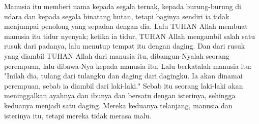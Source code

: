 \begin{biblechapter}
\verse Manusia itu memberi nama kepada segala ternak, kepada burung-burung di udara dan kepada segala binatang hutan, tetapi baginya sendiri ia tidak menjumpai penolong yang sepadan dengan dia.
\verse Lalu TUHAN Allah membuat manusia itu tidur nyenyak; ketika ia tidur, TUHAN Allah mengambil salah satu rusuk dari padanya, lalu menutup tempat itu dengan daging.
\verse Dan dari rusuk yang diambil TUHAN Allah dari manusia itu, dibangun-Nyalah seorang perempuan, lalu dibawa-Nya kepada manusia itu.
\verse Lalu berkatalah manusia itu: "Inilah dia, tulang dari tulangku dan daging dari dagingku. Ia akan dinamai perempuan, sebab ia diambil dari laki-laki."
\verse Sebab itu seorang laki-laki akan meninggalkan ayahnya dan ibunya dan bersatu dengan isterinya, sehingga keduanya menjadi satu daging.
\verse Mereka keduanya telanjang, manusia dan isterinya itu, tetapi mereka tidak merasa malu.
\end{biblechapter}

